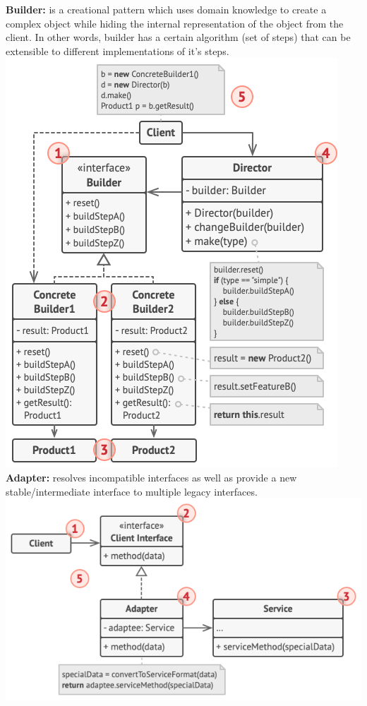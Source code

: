 \textbf{Builder:} is a creational pattern which uses domain knowledge to create a complex object while hiding the internal representation of the object from the client. In other words, builder has a certain algorithm (set of steps) that can be extensible to different implementations of it's steps.\\
\includegraphics[width=\linewidth]{figs/builder.png}\\
\textbf{Adapter:} resolves incompatible interfaces as well as provide a new stable/intermediate interface to multiple legacy interfaces.\\
\includegraphics[width=\linewidth]{figs/adapter.png}\\
